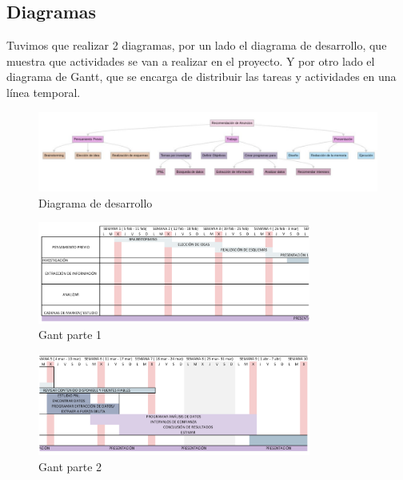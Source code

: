 \documentclass[
  letterpaper,
  DIV=11,
  numbers=noendperiod]{scrartcl}
\begin{document}
\subsection{Diagramas}\label{diagramas}

Tuvimos que realizar 2 diagramas, por un lado el diagrama de desarrollo,
que muestra que actividades se van a realizar en el proyecto. Y por otro
lado el diagrama de Gantt, que se encarga de distribuir las tareas y
actividades en una línea temporal.

\begin{figure}[H]

{\centering \includegraphics{diagrama de desarrollo.png}

}

\caption{Diagrama de desarrollo}

\end{figure}%

\begin{figure}[htbp]
    \centering
    \includegraphics[width=0.8\textwidth, height=0.4\textheight]{gant1.png}
    \caption{Gant parte 1}
    \label{fig:gant1}
\end{figure}

\begin{figure}[htbp]
    \centering
    \includegraphics[width=0.8\textwidth, height=0.4\textheight]{gant2.png}
    \caption{Gant parte 2}
    \label{fig:gant2}
\end{figure}
\end{document}
